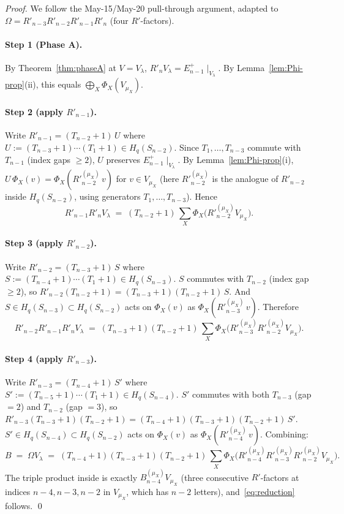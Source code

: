 \documentclass[11pt]{article}
\theoremstyle{definition}
\newcommand{\Hq}{H_q}
\newcommand{\Om}{\Omega}
\newcommand{\Rp}{{R'}}
\begin{document}
\begin{proof}
We follow the May-15/May-20 pull-through argument, adapted to
$\Om = R'_{n-3}R'_{n-2}R'_{n-1}R'_n$ (four $R'$-factors).

\paragraph{Step 1 (Phase A).}  By Theorem~\ref{thm:phaseA} at
$V = V_\lambda$, $R'_n V_\lambda = E_{n-1}^+\!\mid_{V_\lambda}$.
By Lemma~\ref{lem:Phi-prop}(ii), this equals
$\bigoplus_X \Phi_X(V_{\mu_X})$.

\paragraph{Step 2 (apply $R'_{n-1}$).}
Write $R'_{n-1} = (T_{n-2}{+}1)\,U$ where $U := (T_{n-3}{+}1)\cdots
(T_1{+}1) \in \Hq(S_{n-2})$.  Since $T_1, \ldots, T_{n-3}$ commute
with $T_{n-1}$ (index gaps $\ge 2$), $U$ preserves
$E_{n-1}^+\!\mid_{V_\lambda}$.  By Lemma~\ref{lem:Phi-prop}(i),
$U\,\Phi_X(v) = \Phi_X(\Rp_{n-2}^{(\mu_X)}\,v)$ for $v \in V_{\mu_X}$
(here $\Rp_{n-2}^{(\mu_X)}$ is the analogue of $R'_{n-2}$ inside
$\Hq(S_{n-2})$, using generators $T_1, \ldots, T_{n-3}$).  Hence
\[
   R'_{n-1} R'_n V_\lambda
   \;=\; (T_{n-2}{+}1)\,\sum_X
        \Phi_X\bigl(\Rp_{n-2}^{(\mu_X)} V_{\mu_X}\bigr).
\]

\paragraph{Step 3 (apply $R'_{n-2}$).}  Write $R'_{n-2} =
(T_{n-3}{+}1)\,S$ where $S := (T_{n-4}{+}1)\cdots(T_1{+}1) \in
\Hq(S_{n-3})$.  $S$ commutes with $T_{n-2}$ (index gap $\ge 2$), so
$R'_{n-2}(T_{n-2}{+}1) = (T_{n-3}{+}1)(T_{n-2}{+}1)\,S$.  And $S
\in \Hq(S_{n-3}) \subset \Hq(S_{n-2})$ acts on $\Phi_X(v)$ as
$\Phi_X(\Rp_{n-3}^{(\mu_X)}\,v)$.  Therefore
\[
   R'_{n-2} R'_{n-1} R'_n V_\lambda
   \;=\; (T_{n-3}{+}1)(T_{n-2}{+}1)\,\sum_X
        \Phi_X\bigl(\Rp_{n-3}^{(\mu_X)} \Rp_{n-2}^{(\mu_X)} V_{\mu_X}\bigr).
\]

\paragraph{Step 4 (apply $R'_{n-3}$).}  Write $R'_{n-3} =
(T_{n-4}{+}1)\,S'$ where $S' := (T_{n-5}{+}1)\cdots(T_1{+}1) \in
\Hq(S_{n-4})$.  $S'$ commutes with both $T_{n-3}$ (gap $= 2$) and
$T_{n-2}$ (gap $= 3$), so
$R'_{n-3}(T_{n-3}{+}1)(T_{n-2}{+}1) = (T_{n-4}{+}1)(T_{n-3}{+}1)(T_{n-2}{+}1)\,S'$.
$S' \in \Hq(S_{n-4}) \subset \Hq(S_{n-2})$ acts on $\Phi_X(v)$ as
$\Phi_X(\Rp_{n-4}^{(\mu_X)}\,v)$.  Combining:
\[
   B \;=\; \Om V_\lambda
   \;=\; (T_{n-4}{+}1)(T_{n-3}{+}1)(T_{n-2}{+}1)\,\sum_X
        \Phi_X\bigl(\Rp_{n-4}^{(\mu_X)} \Rp_{n-3}^{(\mu_X)} \Rp_{n-2}^{(\mu_X)} V_{\mu_X}\bigr).
\]
The triple product inside is exactly $B_{n-4}^{(\mu_X)} V_{\mu_X}$
(three consecutive $R'$-factors at indices $n-4, n-3, n-2$ in
$V_{\mu_X}$, which has $n - 2$ letters), and~\eqref{eq:reduction}
follows.
\qed
\end{proof}
\end{document}
